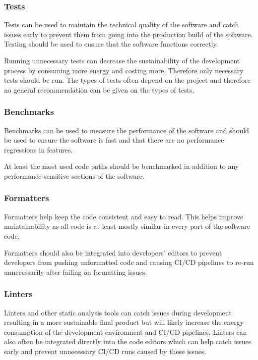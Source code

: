 \subsubsection{Tests}
Tests can be used to maintain the technical quality of the software and catch issues early to prevent them from going into the production build of the software. Testing should be used to ensure that the software functions correctly.

Running unnecessary tests can decrease the sustainability of the development process by consuming more energy and costing more. Therefore only necessary tests should be run. The types of tests often depend on the project and therefore no general recommendation can be given on the types of tests.

\subsubsection{Benchmarks}
Benchmarks can be used to measure the performance of the software and should be used to ensure the software is fast and that there are no performance regressions in features.

At least the most used code paths should be benchmarked in addition to any performance-sensitive sections of the software.

\subsubsection{Formatters}
Formatters help keep the code consistent and easy to read. This helps improve maintainability as all code is at least mostly similar in every part of the software code.

Formatters should also be integrated into developers' editors to prevent developers from pushing unformatted code and causing CI/CD pipelines to re-run unnecessarily after failing on formatting issues.

\subsubsection{Linters}
Linters and other static analysis tools can catch issues during development resulting in a more sustainable final product but will likely increase the energy consumption of the development environment and CI/CD pipelines. Linters can also often be integrated directly into the code editors which can help catch issues early and prevent unnecessary CI/CD runs caused by these issues.

